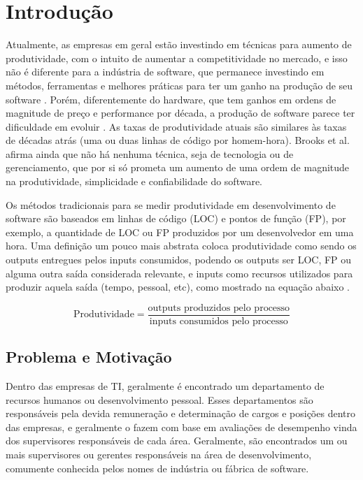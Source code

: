 \chapter[Introdução]{Introdução}

Atualmente, as empresas em geral estão investindo em técnicas para aumento de produtividade, com o intuito de aumentar a competitividade no mercado, e isso não é diferente para a indústria de software, que permanece investindo em métodos, ferramentas e melhores práticas para ter um ganho na produção de seu software \cite{deBarrosSampaio2010}.
Porém, diferentemente do hardware, que tem ganhos em ordens de magnitude de preço e performance por década, a produção de software parece ter dificuldade em evoluir \cite{Boehm1987}. As taxas de produtividade atuais são similares às taxas de décadas atrás (uma ou duas linhas de código por homem-hora)\cite{Boehm1987}. Brooks et al. \cite{BrooksJr1987} afirma ainda que não há nenhuma técnica, seja de tecnologia ou de gerenciamento, que por si só prometa um aumento de uma ordem de magnitude na produtividade, simplicidade e confiabilidade do software.

Os métodos tradicionais para se medir produtividade em desenvolvimento de software são baseados em linhas de código (LOC) e pontos de função (FP)\cite{Wagner2008}, por exemplo, a quantidade de LOC ou FP produzidos por um desenvolvedor em uma hora. Uma definição um pouco mais abstrata coloca produtividade como sendo os outputs entregues pelos inputs consumidos, podendo os outputs ser LOC, FP ou alguma outra saída considerada relevante, e inputs como recursos utilizados para produzir aquela saída (tempo, pessoal, etc), como mostrado na equação abaixo \cite{Boehm1987, Walston1977, Yu1991}.

\begin{equation}
\text{Produtividade} = \dfrac{\text{outputs produzidos pelo processo}}{\text{inputs consumidos pelo processo}}
\end{equation} 

\section{Problema e Motivação}\label{secao1.2}
Dentro das empresas de TI, geralmente é encontrado um departamento de recursos humanos ou desenvolvimento pessoal. Esses departamentos são responsáveis pela devida remuneração e determinação de cargos e posições dentro das empresas, e geralmente o fazem com base em avaliações de desempenho vinda dos supervisores responsáveis de cada área. Geralmente, são encontrados um ou mais supervisores ou gerentes responsáveis na área de desenvolvimento, comumente conhecida pelos nomes de indústria ou fábrica de software.

